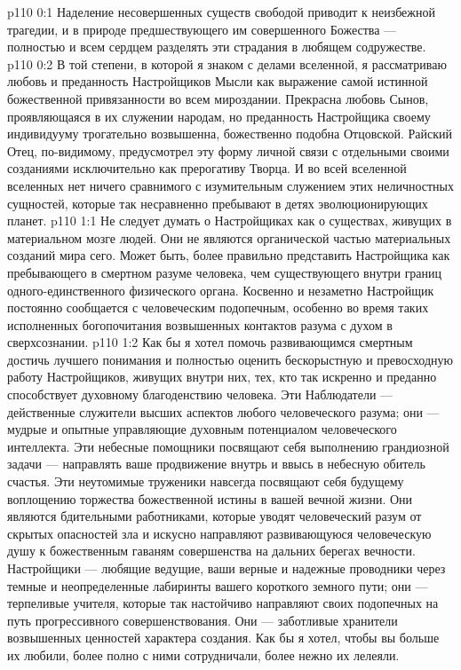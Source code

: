 \author{Одиночный Вестник}
\vs p110 0:1 Наделение несовершенных существ свободой приводит к неизбежной трагедии, и в природе предшествующего им совершенного Божества --- полностью и всем сердцем разделять эти страдания в любящем содружестве.
\vs p110 0:2 В той степени, в которой я знаком с делами вселенной, я рассматриваю любовь и преданность Настройщиков Мысли как выражение самой истинной божественной привязанности во всем мироздании. Прекрасна любовь Сынов, проявляющаяся в их служении народам, но преданность Настройщика своему индивидууму трогательно возвышенна, божественно подобна Отцовской. Райский Отец, по\hyp{}видимому, предусмотрел эту форму личной связи с отдельными своими созданиями исключительно как прерогативу Творца. И во всей вселенной вселенных нет ничего сравнимого с изумительным служением этих неличностных сущностей, которые так несравненно пребывают в детях эволюционирующих планет.
\vs p110 1:1 Не следует думать о Настройщиках как о существах, живущих в материальном мозге людей. Они не являются органической частью материальных созданий мира сего. Может быть, более правильно представить Настройщика как пребывающего в смертном разуме человека, чем существующего внутри границ одного\hyp{}единственного физического органа. Косвенно и незаметно Настройщик постоянно сообщается с человеческим подопечным, особенно во время таких исполненных богопочитания возвышенных контактов разума с духом в сверхсознании.
\vs p110 1:2 Как бы я хотел помочь развивающимся смертным достичь лучшего понимания и полностью оценить бескорыстную и превосходную работу Настройщиков, живущих внутри них, тех, кто так искренно и преданно способствует духовному благоденствию человека. Эти Наблюдатели --- действенные служители высших аспектов любого человеческого разума; они --- мудрые и опытные управляющие духовным потенциалом человеческого интеллекта. Эти небесные помощники посвящают себя выполнению грандиозной задачи --- направлять ваше продвижение внутрь и ввысь в небесную обитель счастья. Эти неутомимые труженики навсегда посвящают себя будущему воплощению торжества божественной истины в вашей вечной жизни. Они являются бдительными работниками, которые уводят человеческий разум от скрытых опасностей зла и искусно направляют развивающуюся человеческую душу к божественным гаваням совершенства на дальних берегах вечности. Настройщики --- любящие ведущие, ваши верные и надежные проводники через темные и неопределенные лабиринты вашего короткого земного пути; они --- терпеливые учителя, которые так настойчиво направляют своих подопечных на путь прогрессивного совершенствования. Они --- заботливые хранители возвышенных ценностей характера создания. Как бы я хотел, чтобы вы больше их любили, более полно с ними сотрудничали, более нежно их лелеяли.
